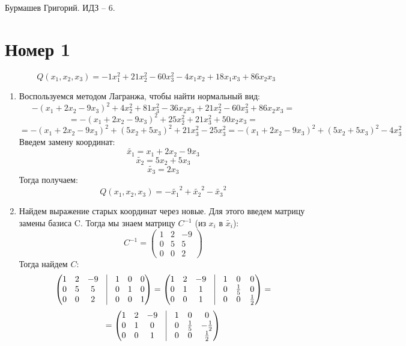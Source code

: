 \documentclass[a4paper,12pt]{article}
\author{Бурмашев Григорий, БПМИ-208}
\title{}
\date{\today}
\begin{document}
\begin{center}
Бурмашев Григорий. ИДЗ -- 6.
\end{center}
\section*{Номер 1}
\[
Q(x_1, x_2, x_3) = -1x_1^2 + 21x_2^2 - 60x_3^2 - 4x_1x_2 + 18x_1x_3 + 86x_2x_3
\]
\begin{enumerate}
\item
Воспользуемся методом Лагранжа, чтобы найти нормальный вид:
\[
-(x_1 + 2x_2 - 9x_3)^2 + 4x_2^2 + 81x_3^2 - 36x_2x_3 + 21x_2^2 - 60x_3^2 + 86x_2x_3 = 
\]
\[
=
-(x_1 + 2x_2 - 9x_3)^2  + 25x_2^2 + 21x_3^2 + 50x_2x_3 = 
\]
\[
=
-(x_1 + 2x_2 - 9x_3)^2 + (5x_2 + 5x_3)^2 + 21x_3^2 - 25x_3^2 = -(x_1 + 2x_2 - 9x_3)^2 + (5x_2 + 5x_3)^2 - 4x_3^2
\]
Введем замену координат:
\[
\widetilde{x_1} = x_1 + 2x_2 - 9x_3
\]
\[
\widetilde{x_2} = 5x_2 + 5x_3
\]
\[
\widetilde{x_3} = 2x_3
\]
Тогда получаем:
\[
Q(x_1, x_2,x_3) = - \widetilde{x_1}^2 + \widetilde{x_2}^2 - \widetilde{x_3}^2
\]
\item
Найдем выражение старых координат через новые. Для этого введем матрицу замены базиса C. Тогда мы знаем матрицу $C^{-1}$ (из $x_i$ в $\widetilde{x_i}$):
\[
C^{-1}= 
\begin{pmatrix}
1 & 2 & -9 \\
0 & 5 & 5 \\
0 & 0 & 2
\end{pmatrix}
\]
Тогда найдем $C$:
\[
\begin{pmatrix}
1 & 2 & -9 & \vrule &1 & 0 & 0  \\
0 & 5 & 5  & \vrule &0 & 1 & 0  \\
0 & 0 & 2 & \vrule &0 & 0 & 1  \\
\end{pmatrix}
=
\begin{pmatrix}
1 & 2 & -9 & \vrule &  1 & 0 & 0 \\
0 & 1 & 1 & \vrule & 0 & \frac{1}{5} & 0 \\
0 & 0 & 1 & \vrule & 0 & 0 & \frac{1}{2} \\
\end{pmatrix}
=
\]
\[
=
\begin{pmatrix}
1 & 2 & -9 & \vrule &  1 & 0 & 0 \\
0 & 1 & 0 & \vrule & 0 & \frac{1}{5} & -\frac{1}{2} \\
0 & 0 & 1 & \vrule & 0 & 0 & \frac{1}{2} \\
\end{pmatrix}
\]
\end{enumerate}
\end{document}
